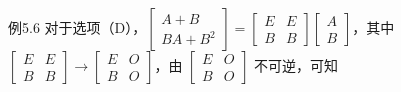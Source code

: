 \begin{fcard}{例5.6}
对于选项（D），$\begin{bmatrix}A+B\\BA+B^{2}\end{bmatrix}=\begin{bmatrix}E&E\\B&B\end{bmatrix}\begin{bmatrix}A\\B\end{bmatrix}$，其中 $\begin{bmatrix}E&E\\B&B\end{bmatrix}\to\begin{bmatrix}E&O\\B&O\end{bmatrix}$，由 $\begin{bmatrix}E&O\\B&O\end{bmatrix}$ 不可逆，可知

\end{fcard}

